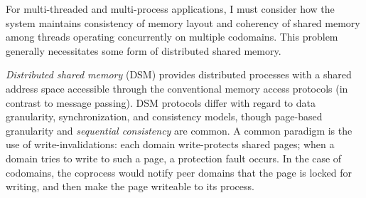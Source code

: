 %

%
%
%
%
%


%
For multi-threaded and multi-process applications, I must consider how the
system maintains consistency of memory layout and coherency of shared memory
among threads operating concurrently on multiple codomains.
%
This problem generally necessitates some form of distributed shared memory.


\emph{Distributed shared memory} (DSM) provides distributed processes with a
shared address space accessible through the conventional memory access protocols
(in contrast to message passing).
%
DSM protocols differ with regard to data granularity, synchronization,
and consistency models, though page-based granularity and \emph{sequential
consistency} are common.
%
A common paradigm is the use of write-invalidations: each domain
write-protects shared pages; when a domain tries to write to such a page, a
protection fault occurs.
%
In the case of codomains, the coprocess would notify peer domains that the
page is locked for writing, and then make the page writeable to its process.


